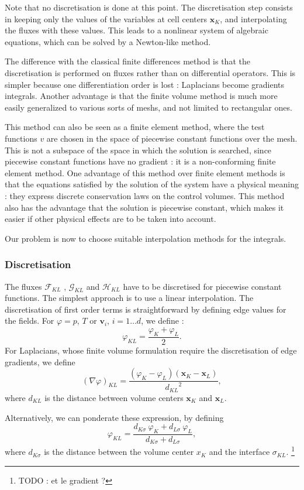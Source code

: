 \documentclass[12pt]{article}
\newcommand{\vb}[1]{\ensuremath{\boldsymbol #1}}
\begin{document}
Note that no discretisation is done at this point. The discretisation
step consists in keeping only the values of the variables at cell
centers $\vb{x}_K$, and interpolating the fluxes with these
values. This leads to a nonlinear system of algebraic equations, which
can be solved by a Newton-like method.

The difference with the classical finite differences method is that
the discretisation is performed on fluxes rather than on differential
operators. This is simpler because one differentiation order is lost :
Laplacians become gradients integrals. Another advantage is that the
finite volume method is much more easily generalized to various sorts
of meshs, and not limited to rectangular ones.

This method can also be seen as a finite element method, where the
test functions $v$ are chosen in the space of piecewise constant
functions over the mesh. This is not a subspace of the space in which
the solution is searched, since piecewise constant functions have no
gradient : it is a non-conforming finite element method. One advantage
of this method over finite element methods is that the equations
satisfied by the solution of the system have a physical meaning : they
express discrete conservation laws on the control volumes. This method
also has the advantage that the solution is piecewise constant, which
makes it easier if other physical effects are to be taken into
account.

Our problem is now to choose suitable interpolation methods for the
integrals.
\subsubsection{Discretisation}
The fluxes $\mathcal F_{KL}$ , $\mathcal G_{KL}$ and $\mathcal H_{KL}$
have to be discretised for piecewise constant functions. The simplest
approach is to use a linear interpolation. The discretisation of first
order terms is straightforward by defining edge values for the
fields. For $\varphi = p$, $T$ or $\vb{v_{i}}$, $i = 1 \dots d$, we
define : $$\varphi_{KL} = \frac{\varphi_{K} + \varphi_{L}}{2}.$$ For
Laplacians, whose finite volume formulation require the discretisation
of edge gradients, we define $$(\nabla \varphi)_{KL} =
\frac{(\varphi_{K} - \varphi_{L}) (\vb{x}_{K} - \vb{x_{L}})}
{{d_{KL}}^{2}},$$ where $d_{KL}$ is the distance between volume
centers $\vb{x}_{K}$ and $\vb{x}_{L}$.

Alternatively, we can ponderate these expression, by
defining $$\varphi_{KL} = \frac{d_{K\sigma} \ \varphi_{K} +
  d_{L\sigma} \ \varphi_{L}}{d_{K\sigma} + d_{L\sigma}},$$ where $d_{K
  \sigma}$ is the distance between the volume center $x_{K}$ and the
interface $\sigma_{KL}$. \footnote{TODO : et le gradient ?}
\end{document}
